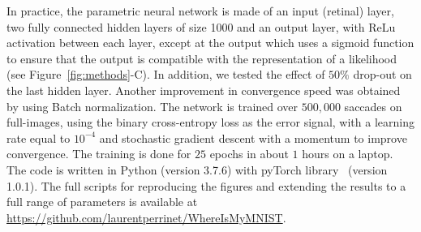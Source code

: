 

In practice, the parametric neural network is made of an input (retinal) layer, two fully connected hidden layers of size 1000
and an output layer, with ReLu activation between each layer, except at the output which uses a sigmoid function to ensure that the output is compatible with the representation of a likelihood (see  Figure~\ref{fig:methods}-C). 
In addition, we tested \ICANN
\else the effect of $50 \%$ drop-out on the last hidden layer.
Another \fi improvement in convergence speed was obtained by using Batch normalization. The network is trained over $500,000$ saccades on full-images, using the binary cross-entropy loss as the error signal, with a learning rate equal to $10^{-4}$ and stochastic gradient descent with a momentum to improve convergence. The training is done for $25$ epochs in about $1$ hours on a laptop. The code is written in Python (version 3.7.6) with pyTorch library~\citep{Paszke17} (version 1.0.1). The full scripts for reproducing the figures and extending the results to a full range of parameters is available at \url{https://github.com/laurentperrinet/WhereIsMyMNIST}. %
